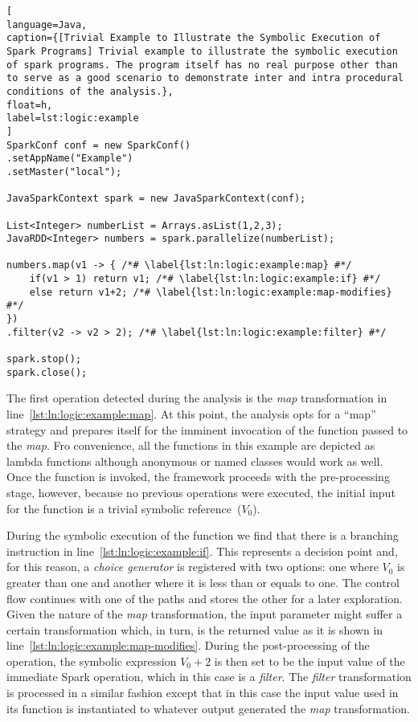 \begin{lstlisting}[
language=Java,
caption={[Trivial Example to Illustrate the Symbolic Execution of Spark Programs] Trivial example to illustrate the symbolic execution of spark programs. The program itself has no real purpose other than to serve as a good scenario to demonstrate inter and intra procedural conditions of the analysis.},
float=h,
label=lst:logic:example
]
SparkConf conf = new SparkConf()
.setAppName("Example")
.setMaster("local");

JavaSparkContext spark = new JavaSparkContext(conf);

List<Integer> numberList = Arrays.asList(1,2,3);
JavaRDD<Integer> numbers = spark.parallelize(numberList);

numbers.map(v1 -> { /*# \label{lst:ln:logic:example:map} #*/
	if(v1 > 1) return v1; /*# \label{lst:ln:logic:example:if} #*/
	else return v1+2; /*# \label{lst:ln:logic:example:map-modifies} #*/
})
.filter(v2 -> v2 > 2); /*# \label{lst:ln:logic:example:filter} #*/

spark.stop();
spark.close();
\end{lstlisting}

The first operation detected during the analysis is the \textit{map} transformation in line~\ref{lst:ln:logic:example:map}. At this point, the analysis opts for a ``map'' strategy and prepares itself for the imminent invocation of the function passed to the \textit{map}. Fro convenience, all the functions in this example are depicted as lambda functions although anonymous or named classes would work as well. Once the function is invoked, the framework proceeds with the pre-processing stage, however, because no previous operations were executed, the initial input for the function is a trivial symbolic reference~($V_0$). 


During the symbolic execution of the function we find that there is a branching instruction in line~\ref{lst:ln:logic:example:if}. This represents a decision point and, for this reason, a \textit{choice generator} is registered with two options: one where $V_0$ is greater than one and another where it is less than or equals to one. The control flow continues with one of the paths and stores the other for a later exploration. Given the nature of the \textit{map} transformation, the input parameter might suffer a certain transformation which, in turn, is the returned value as it is shown in line~\ref{lst:ln:logic:example:map-modifies}. During the post-processing of the operation, the symbolic expression $V_0 + 2$ is then set to be the input value of the immediate Spark operation, which in this case is a \textit{filter}. The \textit{filter} transformation is processed in a similar fashion except that in this case the input value used in its function is instantiated to whatever output generated the \textit{map} transformation.

